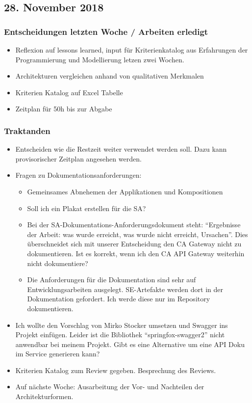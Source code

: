 \documentclass{article}
\begin{document}
    
\subsection{28. November 2018} \label{chap:Protokols:28nov2018}

\subsubsection{Entscheidungen letzten Woche / Arbeiten erledigt}
\begin{itemize}
    \item Reflexion auf lessons learned, input für Kriterienkatalog aus Erfahrungen der Programmierung und Modellierung letzen zwei Wochen.
    \item Architekturen vergleichen anhand von qualitativen Merkmalen
    \item Kriterien Katalog auf Excel Tabelle \checkmark
    \item Zeitplan für 50h bis zur Abgabe \checkmark
\end{itemize}

\subsubsection{Traktanden}
\begin{itemize}
    \item Entscheiden wie die Restzeit weiter verwendet werden soll. Dazu kann provisorischer Zeitplan angesehen werden.
    \item Fragen zu Dokumentationsanforderungen:
        \begin{itemize}
            \item Gemeinsames Abnehemen der Applikationen und Kompositionen
            \item Soll ich ein Plakat erstellen für die SA?
            \item Bei der SA-Dokumentations-Anforderungsdokument steht: ``Ergebnisse der Arbeit: was wurde erreicht, was wurde nicht erreicht, Ursachen''. Dies überschneidet sich mit unserer Entscheidung den CA Gateway nicht zu dokumentieren. Ist es korrekt, wenn ich den CA API Gateway weiterhin nicht dokumentiere?
            \item Die Anforderungen für die Dokumentation sind sehr auf Entwicklungsarbeiten ausgelegt. SE-Artefakte werden dort in der Dokumentation gefordert. Ich werde diese nur im Repository dokumentieren.
        \end{itemize}
        \item Ich wollte den Vorschlag von Mirko Stocker umsetzen und Swagger ins Projekt einfügen. Leider ist die Bibliothek ``springfox-swagger2'' nicht anwendbar bei meinem Projekt. Gibt es eine Alternative um eine API Doku im Service generieren kann?
        \item Kriterien Katalog zum Review gegeben. Besprechung des Reviews.
        \item Auf nächste Woche: Ausarbeitung der Vor- und Nachteilen der Architekturformen.
\end{itemize}
\end{document}
